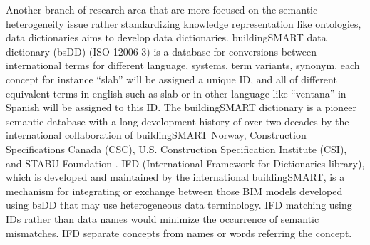 \documentclass[Journal,InsideFigs, DoubleSpace]{ascelike} %
\begin{document}
Another branch of research area that are more focused on the semantic heterogeneity issue rather standardizing knowledge representation like ontologies, data dictionaries aims to develop data dictionaries. buildingSMART data dictionary (bsDD) (ISO 12006-3) \cite{buildingsmartData} is a database for conversions between international terms for different language, systems, term variants, synonym. each concept for instance ``slab'' will be assigned a unique ID, and all of different equivalent terms in english such as slab or in other language like ``ventana'' in Spanish will be assigned to this ID. The buildingSMART dictionary is a pioneer semantic database with a long development history of over two decades by the international collaboration of buildingSMART Norway, Construction Specifications Canada (CSC), U.S. Construction Specification Institute (CSI), and STABU Foundation \cite{hezik08}. IFD (International Framework for Dictionaries library), which is developed and maintained by the international buildingSMART, is a mechanism for integrating or exchange between those BIM models developed using bsDD that may use heterogeneous data terminology. IFD matching using IDs rather than data names would minimize the occurrence of semantic mismatches. IFD separate concepts from names or words referring the concept. 
\par
\end{document}
